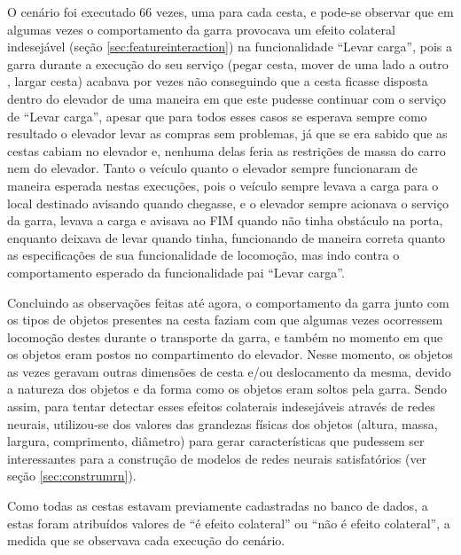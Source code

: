 O cenário foi executado 66 vezes, uma para cada cesta, e pode-se observar que em algumas vezes o comportamento da garra provocava um efeito colateral indesejável (seção \ref{sec:featureinteraction}) na funcionalidade ``Levar carga'', pois a garra durante a execução do seu serviço (pegar cesta, mover de uma lado a outro , largar cesta) acabava por vezes não conseguindo que a cesta ficasse disposta dentro do elevador de uma maneira em que este pudesse continuar com o serviço de ``Levar carga'', apesar que para todos esses casos se esperava sempre como resultado o elevador levar as compras sem problemas, já que se era sabido que as cestas cabiam no elevador e, nenhuma delas feria as restrições de massa do carro nem do elevador. Tanto o veículo quanto o elevador sempre funcionaram de maneira esperada nestas execuções, pois o veículo sempre levava a carga para o local destinado avisando quando chegasse, e o elevador sempre acionava o serviço da garra, levava a carga  e avisava ao FIM quando não tinha obstáculo na porta, enquanto deixava de levar quando tinha, funcionando de maneira correta quanto as especificações de sua funcionalidade de locomoção, mas indo contra o comportamento esperado da funcionalidade pai ``Levar carga''. 

Concluindo as observações feitas até agora, o comportamento da garra junto com os tipos de objetos presentes na cesta faziam com que algumas vezes ocorressem locomoção destes durante o transporte da garra, e também no momento em que os objetos eram postos no compartimento do elevador. Nesse momento, os objetos as vezes geravam outras dimensões de cesta e/ou deslocamento da mesma, devido a natureza dos objetos e da forma como os objetos eram soltos pela garra. Sendo assim, para tentar detectar esses efeitos colaterais indesejáveis através de redes neurais, utilizou-se dos valores das grandezas físicas dos objetos (altura, massa, largura, comprimento, diâmetro) para gerar características que pudessem ser interessantes para a construção de modelos de redes neurais satisfatórios (ver seção \ref{sec:construmrn}).

Como todas as cestas estavam previamente cadastradas no banco de dados, a estas foram atribuídos valores de ``é efeito colateral'' ou ``não é efeito colateral'', a medida que se observava cada execução do cenário.

